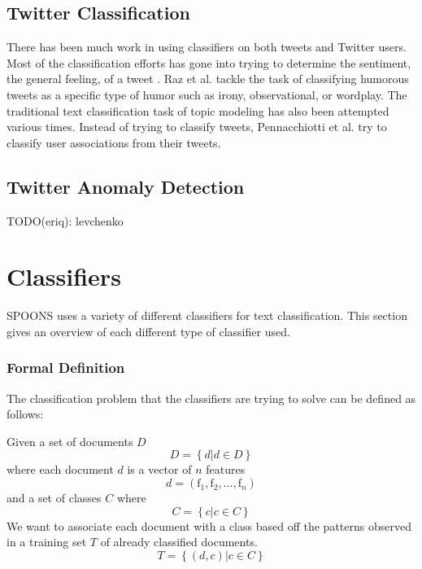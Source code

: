 \documentclass[12pt]{ucthesis}
\begin{document}
\subsection{Twitter Classification}
\label{background-twitter-classification}
There has been much work in using classifiers on both tweets and Twitter users.
Most of the classification efforts has gone into trying to determine the sentiment,
the general feeling, of a tweet \cite{Jiang}\cite{Mukherjee}\cite{Saif}\cite{Wang}.
Raz et al. tackle the task of classifying humorous tweets as a specific type of humor
such as irony, observational, or wordplay\cite{Raz}.
The traditional text classification task of topic modeling has also been attempted various times\cite{hong}\cite{Zhao}.
Instead of trying to classify tweets, Pennacchiotti et al. try to classify user associations from
their tweets\cite{Pennacchiotti}.

\subsection{Twitter Anomaly Detection}
\label{background-twitter-anomaly}
TODO(eriq): levchenko

\section{Classifiers}
\label{background-classifiers}
SPOONS uses a variety of different classifiers for text classification.
This section gives an overview of each different type of classifier used.

\subsubsection{Formal Definition}
\label{background-classifiers-def}
The classification problem that the classifiers are trying to solve can be defined as follows:

Given a set of documents $D$
\begin{equation*}
   D = \left \{ d | d \in D \right \}
\end{equation*}
where each document $d$ is a vector of $n$ features
\begin{equation*}
   d = (\textrm{f}_{1}, \textrm{f}_{2}, ..., \textrm{f}_{n})
\end{equation*}
and a set of classes $C$ where
\begin{equation*}
   C = \left \{ c | c \in C \right \}
\end{equation*}
We want to associate each document with a class based off the patterns observed in a training set $T$ of already classified documents.
\begin{equation*}
   T = \left \{ (d, c) | c \in C \right \}
\end{equation*}
\end{document}
